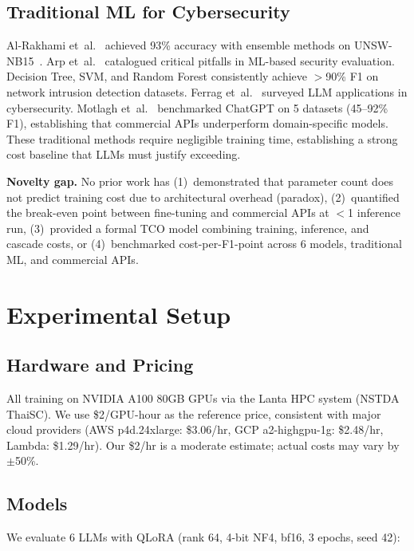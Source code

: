 \documentclass[review,3p]{elsarticle}
\begin{document}
\subsection{Traditional ML for Cybersecurity}
Al-Rakhami et~al.~\cite{alrakhami2022} achieved 93\% accuracy with ensemble methods on UNSW-NB15~\cite{moustafa2016}. Arp et~al.~\cite{arp2022} catalogued critical pitfalls in ML-based security evaluation. Decision Tree, SVM, and Random Forest consistently achieve $>$90\% F1 on network intrusion detection datasets. Ferrag et~al.~\cite{ferrag2024} surveyed LLM applications in cybersecurity. Motlagh et~al.~\cite{motlagh2024} benchmarked ChatGPT on 5 datasets (45--92\% F1), establishing that commercial APIs underperform domain-specific models. These traditional methods require negligible training time, establishing a strong cost baseline that LLMs must justify exceeding.

\textbf{Novelty gap.} No prior work has (1)~demonstrated that parameter count does not predict training cost due to architectural overhead (paradox), (2)~quantified the break-even point between fine-tuning and commercial APIs at $<$1 inference run, (3)~provided a formal TCO model combining training, inference, and cascade costs, or (4)~benchmarked cost-per-F1-point across 6 models, traditional ML, and commercial APIs.

\section{Experimental Setup}

\subsection{Hardware and Pricing}
All training on NVIDIA A100 80GB GPUs via the Lanta HPC system (NSTDA ThaiSC). We use \$2/GPU-hour as the reference price, consistent with major cloud providers (AWS p4d.24xlarge: \$3.06/hr, GCP a2-highgpu-1g: \$2.48/hr, Lambda: \$1.29/hr). Our \$2/hr is a moderate estimate; actual costs may vary by $\pm$50\%.

\subsection{Models}
We evaluate 6 LLMs with QLoRA (rank 64, 4-bit NF4, bf16, 3 epochs, seed 42):
\end{document}
